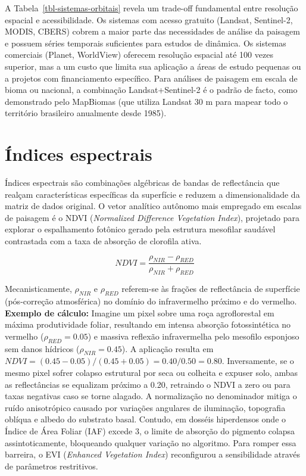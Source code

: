 \documentclass[
  portuguese,
  11pt,
  a4paper,
  open=any]{scrbook}
\begin{document}
A Tabela~\ref{tbl-sistemas-orbitais} revela um trade-off fundamental
entre resolução espacial e acessibilidade. Os sistemas com acesso
gratuito (Landsat, Sentinel-2, MODIS, CBERS) cobrem a maior parte das
necessidades de análise da paisagem e possuem séries temporais
suficientes para estudos de dinâmica. Os sistemas comerciais (Planet,
WorldView) oferecem resolução espacial até 100 vezes superior, mas a um
custo que limita sua aplicação a áreas de estudo pequenas ou a projetos
com financiamento específico. Para análises de paisagem em escala de
bioma ou nacional, a combinação Landsat+Sentinel-2 é o padrão de facto,
como demonstrado pelo MapBiomas (que utiliza Landsat 30 m para mapear
todo o território brasileiro anualmente desde 1985).

\section{Índices espectrais}\label{uxedndices-espectrais}

Índices espectrais são combinações algébricas de bandas de reflectância
que realçam características específicas da superfície e reduzem a
dimensionalidade da matriz de dados original. O vetor analítico autônomo
mais empregado em escalas de paisagem é o NDVI (\emph{Normalized
Difference Vegetation Index}), projetado para explorar o espalhamento
fotônico gerado pela estrutura mesofilar saudável contrastada com a taxa
de absorção de clorofila ativa.

\[
NDVI = \frac{\rho_{NIR} - \rho_{RED}}{\rho_{NIR} + \rho_{RED}}
\]

Mecanisticamente, \(\rho_{NIR}\) e \(\rho_{RED}\) referem-se às frações
de reflectância de superfície (pós-correção atmosférica) no domínio do
infravermelho próximo e do vermelho. \textbf{Exemplo de cálculo:}
Imagine um pixel sobre uma roça agroflorestal em máxima produtividade
foliar, resultando em intensa absorção fotossintética no vermelho
(\(\rho_{RED} = 0.05\)) e massiva reflexão infravermelha pelo mesofilo
esponjoso sem danos hídricos (\(\rho_{NIR} = 0.45\)). A aplicação
resulta em
\(NDVI = (0.45 - 0.05) / (0.45 + 0.05) = 0.40 / 0.50 = 0.80\).
Inversamente, se o mesmo pixel sofrer colapso estrutural por seca ou
colheita e expuser solo, ambas as reflectâncias se equalizam próximo a
0.20, retraindo o NDVI a zero ou para taxas negativas caso se torne
alagado. A normalização no denominador mitiga o ruído anisotrópico
causado por variações angulares de iluminação, topografia oblíqua e
albedo do substrato basal. Contudo, em dosséis hiperdensos onde o Índice
de Área Foliar (IAF) excede 3, o limite de absorção do pigmento colapsa
assintoticamente, bloqueando qualquer variação no algoritmo. Para romper
essa barreira, o EVI (\emph{Enhanced Vegetation Index}) reconfigurou a
sensibilidade através de parâmetros restritivos.
\end{document}
